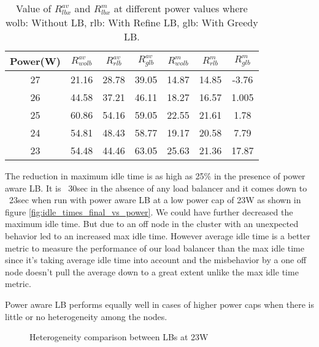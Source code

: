 \begin{table}[h]
\begin{tabular}{|c|c|c|c|c|c|c|}
\hline
Power(W) & $R^{av}_{wolb}$ & $R^{av}_{rlb}$ & $R^{av}_{glb}$ & $R^{m}_{wolb}$ & $R^{m}_{rlb}$ & $R^{m}_{glb}$ \\ \hline
27 & 21.16 & 28.78 & 39.05 & 14.87 & 14.85 & -3.76 \\ \hline
26 & 44.58 & 37.21 & 46.11 & 18.27 & 16.57 & 1.005 \\ \hline
25 & 60.86 & 54.16 & 59.05 & 22.55 & 21.61 & 1.78 \\ \hline
24 & 54.81 & 48.43 & 58.77 & 19.17 & 20.58 & 7.79 \\ \hline
23 & 54.48 & 44.46 & 63.05 & 25.63 & 21.36 & 17.87 \\ \hline
\end{tabular}
\caption{Value of $R^{av}_{lbx}$ and $R^{m}_{lbx}$ at different power values where wolb: Without LB, rlb: With Refine LB, glb: With Greedy LB. }
\label{tb:2}
\end{table}



The reduction in maximum idle time is as high as 25\% in the presence of power
aware LB. It is ~30sec in the absence of any load balancer and it comes down to
~23sec when run with power aware LB at a low power cap of 23W as shown in
figure \ref{fig:idle_times_final_vs_power}. We could have further decreased
the maximum idle time. But due to an off node in the cluster with an unexpected
behavior led to an increased max idle time. However average idle time is a
better metric to measure the performance of our load balancer than the max idle
time since it’s taking average idle time into account and the misbehavior by a
one off node doesn’t pull the average down to a great extent unlike the max
idle time metric.

Power aware LB performs equally well in cases of higher power caps when there
is little or no heterogeneity among the nodes. 

\begin{figure}
\centering
\caption{Heterogeneity comparison between LBs at 23W} 
\label{fig:heter_final}
\end{figure}

